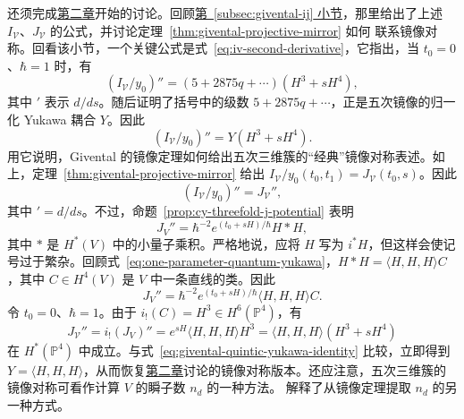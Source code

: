 \begin{example}
还须完成\hyperref[chap:quintic]{第二章}开始的讨论。回顾\hyperref[subsec:givental-ij]{第~\ref*{subsec:givental-ij} 小节}，那里给出了上述 $I_{\mathcal V}$、$J_{\mathcal V}$ 的公式，并讨论定理~\ref{thm:givental-projective-mirror} 如何
联系镜像对称。回看该小节，一个关键公式是式~\eqref{eq:iv-second-derivative}，它指出，当 $t_0=0$、$\hbar=1$ 时，有
\[
(I_{\mathcal V}/y_0)''=(5+2875q+\cdots)(H^3+sH^4),
\]
其中 $'$ 表示 $d/ds$。随后证明了括号中的级数 $5+2875q+\cdots$，正是五次镜像的归一化 Yukawa 耦合 $Y$。因此
\begin{equation}\label{eq:givental-quintic-yukawa-identity}
(I_{\mathcal V}/y_0)''=Y(H^3+sH^4).
\end{equation}
用它说明，Givental 的镜像定理如何给出五次三维簇的“经典”镜像对称表述。如上，定理~\ref{thm:givental-projective-mirror} 给出 $I_{\mathcal V}/y_0(t_0,t_1)=J_{\mathcal V}(t_0,s)$。因此
\[
(I_{\mathcal V}/y_0)''=J_{\mathcal V}'',
\]
其中 $'=d/ds$。不过，命题~\ref{prop:cy-threefold-j-potential} 表明
\[
J_V''=\hbar^{-2}e^{(t_0+sH)/\hbar}H*H,
\]
其中 $*$ 是 $H^*(V)$ 中的小量子乘积。严格地说，应将 $H$ 写为 $i^*H$，但这样会使记号过于繁杂。回顾式~\eqref{eq:one-parameter-quantum-yukawa}，$H*H=\langle H,H,H\rangle C$，其中 $C\in H^4(V)$ 是 $V$ 中一条直线的类。因此
\[
J_V''=\hbar^{-2}e^{(t_0+sH)/\hbar}\langle H,H,H\rangle C.
\]
令 $t_0=0$、$\hbar=1$。由于 $i_!(C)=H^3\in H^6(\mathbb P^4)$，有
\[
J_{\mathcal V}''=i_!(J_V)''=e^{sH}\langle H,H,H\rangle H^3
=\langle H,H,H\rangle(H^3+sH^4)
\]
在 $H^*(\mathbb P^4)$ 中成立。与式~\eqref{eq:givental-quintic-yukawa-identity} 比较，立即得到 $Y=\langle H,H,H\rangle$，从而恢复\hyperref[chap:quintic]{第二章}讨论的镜像对称版本。还应注意，五次三维簇的镜像对称可看作计算 $V$ 的瞬子数 $n_d$ 的一种方法。 解释了从镜像定理提取 $n_d$ 的另一种方式。
\end{example}


